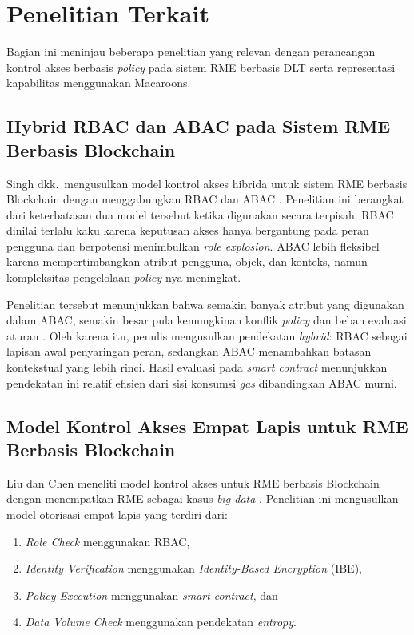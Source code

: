 \section{Penelitian Terkait}
\label{sec:penelitian-terkait}

\noindent Bagian ini meninjau beberapa penelitian yang relevan dengan perancangan kontrol akses berbasis \textit{policy} pada sistem RME berbasis DLT serta representasi kapabilitas menggunakan Macaroons.

\subsection{Hybrid RBAC dan ABAC pada Sistem RME Berbasis Blockchain}
\label{subsec:hybrid-rbac-abac}

Singh dkk.\ mengusulkan model kontrol akses hibrida untuk sistem RME berbasis Blockchain dengan menggabungkan RBAC dan ABAC \autocite{singh2025granular}. Penelitian ini berangkat dari keterbatasan dua model tersebut ketika digunakan secara terpisah. RBAC dinilai terlalu kaku karena keputusan akses hanya bergantung pada peran pengguna dan berpotensi menimbulkan \textit{role explosion}. ABAC lebih fleksibel karena mempertimbangkan atribut pengguna, objek, dan konteks, namun kompleksitas pengelolaan \textit{policy}-nya meningkat.

Penelitian tersebut menunjukkan bahwa semakin banyak atribut yang digunakan dalam ABAC, semakin besar pula kemungkinan konflik \textit{policy} dan beban evaluasi aturan \autocite{singh2025granular}. Oleh karena itu, penulis mengusulkan pendekatan \textit{hybrid}: RBAC sebagai lapisan awal penyaringan peran, sedangkan ABAC menambahkan batasan kontekstual yang lebih rinci. Hasil evaluasi pada \textit{smart contract} menunjukkan pendekatan ini relatif efisien dari sisi konsumsi \textit{gas} dibandingkan ABAC murni.

\subsection{Model Kontrol Akses Empat Lapis untuk RME Berbasis Blockchain}
\label{subsec:empat-lapis-emr}

Liu dan Chen meneliti model kontrol akses untuk RME berbasis Blockchain dengan menempatkan RME sebagai kasus \textit{big data} \autocite{liu2025accesscontrol}. Penelitian ini mengusulkan model otorisasi empat lapis yang terdiri dari:
\begin{enumerate}
	\item \textit{Role Check} menggunakan RBAC,
	\item \textit{Identity Verification} menggunakan \textit{Identity-Based Encryption} (IBE),
	\item \textit{Policy Execution} menggunakan \textit{smart contract}, dan
	\item \textit{Data Volume Check} menggunakan pendekatan \textit{entropy}.
\end{enumerate}

